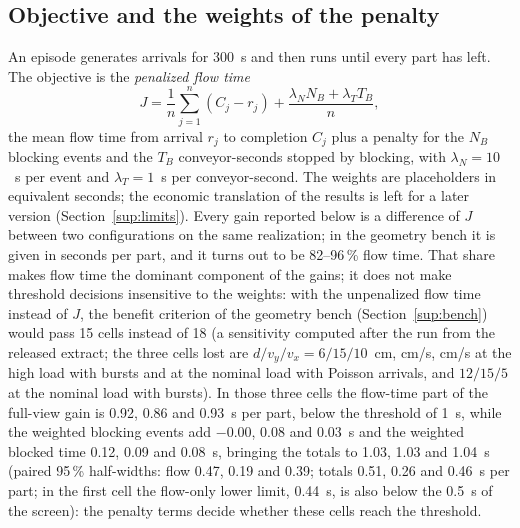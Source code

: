 \documentclass[11pt,a4paper]{article}
\begin{document}
\subsection{Objective and the weights of the penalty}\label{sup:weights}
An episode generates arrivals for 300~s and then runs until every part has left. The
objective is the \emph{penalized flow time}
\begin{equation}
J=\frac{1}{n}\sum_{j=1}^{n}(C_j-r_j)+\frac{\lambda_N N_B+\lambda_T T_B}{n},
\end{equation}
the mean flow time from arrival $r_j$ to completion $C_j$ plus a penalty for the $N_B$
blocking events and the $T_B$ conveyor-seconds stopped by blocking, with $\lambda_N=10$~s
per event and $\lambda_T=1$~s per conveyor-second. The weights are placeholders in
equivalent seconds; the economic translation of the results is left for a later version
(Section~\ref{sup:limits}). Every gain reported below is a difference of $J$ between two
configurations on the same realization; in the geometry bench it is given in seconds per
part, and it turns out to be 82--96\,\% flow time. That share makes flow time the dominant
component of the gains; it does not make threshold decisions insensitive to the weights:
with the unpenalized flow time instead of $J$, the benefit criterion of the geometry bench
(Section~\ref{sup:bench}) would pass 15 cells instead of 18 (a sensitivity computed after
the run from the released extract; the three cells lost are $d/v_y/v_x=6/15/10$~cm,
cm/s, cm/s at the high load with bursts and at the nominal load with Poisson arrivals,
and $12/15/5$ at the nominal load with bursts). In those three cells the flow-time part of
the full-view gain is 0.92, 0.86 and 0.93~s per part, below the threshold of 1~s, while the
weighted blocking events add $-0.00$, 0.08 and 0.03~s and the weighted blocked time 0.12,
0.09 and 0.08~s, bringing the totals to 1.03, 1.03 and 1.04~s (paired 95\,\% half-widths:
flow 0.47, 0.19 and 0.39; totals 0.51, 0.26 and 0.46~s per part; in the first cell the
flow-only lower limit, 0.44~s, is also below the 0.5~s of the screen): the penalty terms
decide whether these cells reach the threshold.
\end{document}

